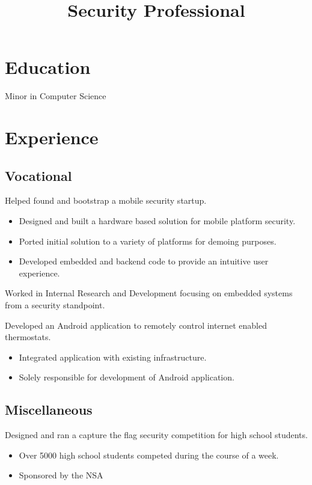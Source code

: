 \documentclass[10pt,a4paper,sans]{moderncv}
\title{Security Professional}
\begin{document}
\makecvtitle

\section{Education}
{Minor in Computer Science}

\section{Experience}
\subsection{Vocational}
{Helped found and bootstrap a mobile security startup.
\begin{itemize}
\item Designed and built a hardware based solution for mobile platform security.
\item Ported initial solution to a variety of platforms for demoing purposes.
\item Developed embedded and backend code to provide an intuitive user experience.
\end{itemize}}

{Worked in Internal Research and Development focusing on embedded systems from a security standpoint.}

{Developed an Android application to remotely control internet enabled thermostats.
\begin{itemize}
\item Integrated application with existing infrastructure.
\item Solely responsible for development of Android application.
\end{itemize}}

\subsection{Miscellaneous}
{Designed and ran a capture the flag security competition for high school students.
\begin{itemize}
\item Over 5000 high school students competed during the course of a week.
\item Sponsored by the NSA
\end{itemize}}
\end{document}
